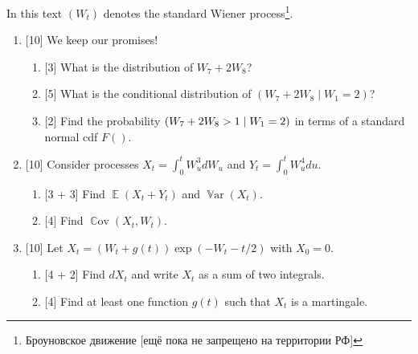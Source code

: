 \documentclass[12pt]{article}
\DeclareMathOperator{\Cov}{\mathbb{C}ov}
\DeclareMathOperator{\Var}{\mathbb{V}ar}
\let\P\relax
\DeclareMathOperator{\P}{\mathbb{P}}
\DeclareMathOperator{\E}{\mathbb{E}}
\begin{document}
In this text $(W_t)$ denotes the standard Wiener process\footnote{Броуновское движение [ещё пока не запрещено на территории РФ]}.


\begin{enumerate}
    \item {[10]} We keep our promises! 
    \begin{enumerate}
        \item {[3]} What is the distribution of $W_7 + 2W_8$? 
        \item {[5]} What is the conditional distribution of $(W_7 + 2W_8 \mid W_1 = 2)$?
        \item {[2]} Find the probability $\P(W_7 + 2W_8 > 1 \mid W_1 = 2)$ in terms of a standard normal cdf $F()$.
    \end{enumerate}


    \item {[10]} Consider processes $X_t = \int_0^t W_u^3 dW_u$ and $Y_t = \int_0^t W_u^4 du$.
    \begin{enumerate}
        \item {[3 + 3]} Find $\E(X_t + Y_t)$ and $\Var(X_t)$.
        \item {[4]} Find $\Cov(X_t, W_t)$.
    \end{enumerate}

    \item {[10]} Let $X_t = (W_t + g(t))\exp(-W_t - t/2)$ with $X_0 = 0$.
    \begin{enumerate}
        \item {[4 + 2]} Find $dX_t$ and write $X_t$ as a sum of two integrals.
        \item {[4]} Find at least one function $g(t)$ such that $X_t$ is a martingale.
    \end{enumerate}


    

\end{enumerate}
\end{document}
